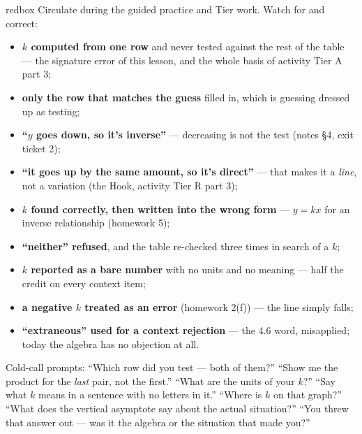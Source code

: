 \documentclass[10pt]{article}
\begin{document}
\begin{skillbox}{redbox}
Circulate during the guided practice and Tier work. Watch for and correct:
\begin{itemize}[leftmargin=1.2em, nosep]
  \item \textbf{$k$ computed from one row} and never tested against the rest of the table --- the signature error of this lesson, and the whole basis of activity Tier A part 3;
  \item \textbf{only the row that matches the guess} filled in, which is guessing dressed up as testing;
  \item \textbf{``$y$ goes down, so it's inverse''} --- decreasing is not the test (notes \S4, exit ticket 2);
  \item \textbf{``it goes up by the same amount, so it's direct''} --- that makes it a \emph{line}, not a variation (the Hook, activity Tier R part 3);
  \item \textbf{$k$ found correctly, then written into the wrong form} --- $y=kx$ for an inverse relationship (homework 5);
  \item \textbf{``neither'' refused}, and the table re-checked three times in search of a $k$;
  \item \textbf{$k$ reported as a bare number} with no units and no meaning --- half the credit on every context item;
  \item \textbf{a negative $k$ treated as an error} (homework 2(f)) --- the line simply falls;
  \item \textbf{``extraneous'' used for a context rejection} --- the 4.6 word, misapplied; today the algebra has no objection at all.
\end{itemize}
Cold-call prompts: ``Which row did you test --- both of them?'' ``Show me the product for the
\emph{last} pair, not the first.'' ``What are the units of your $k$?'' ``Say what $k$ means in a
sentence with no letters in it.'' ``Where is $k$ on that graph?'' ``What does the vertical asymptote
say about the actual situation?'' ``You threw that answer out --- was it the algebra or the situation
that made you?''
\end{skillbox}
\end{document}

